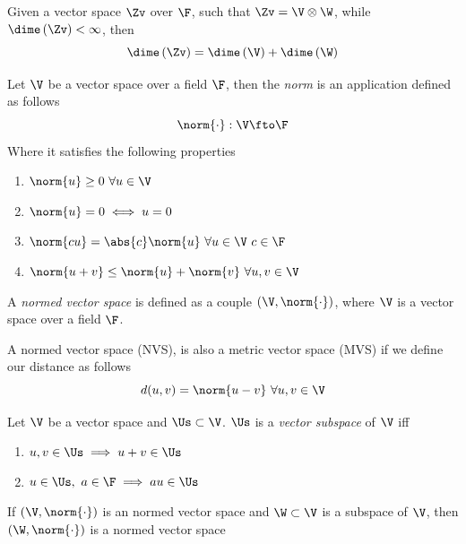 \documentclass[../mmf.tex]{subfiles}
\begin{document}
\begin{thm}
	Given a vector space $\Zv$ over $\F$, such that $\Zv=\V\otimes\W$, while $\dime\left( \Zv \right)<\infty$, then
	\begin{equation*}
		\dime\left( \Zv \right)=\dime\left( \V \right)+\dime\left( \W \right)
	\end{equation*}
\end{thm}
\begin{dfn}[Norm]
	Let $\V$ be a vector space over a field $\F$, then the \textit{norm} is an application defined as follows
	\begin{equation*}
		\norm{\cdot}:\V\fto\F
	\end{equation*}
	Where it satisfies the following properties
	\begin{enumerate}
	\item $\norm{u}\ge0\ \forall u\in\V$
	\item $\norm{u}=0\iff u=0$
	\item $\norm{cu}=\abs{c}\norm{u}\ \forall u\in\V\ c\in\F$
	\item $\norm{u+v}\le\norm{u}+\norm{v}\ \forall u,v\in\V$
	\end{enumerate}
\end{dfn}
\begin{dfn}
	A \textit{normed vector space} is defined as a couple $(\V,\norm{\cdot})$, where $\V$ is a vector space over a field $\F$.
\end{dfn}
\begin{prop}
	A normed vector space (NVS), is also a metric vector space (MVS) if we define our distance as follows
	\begin{equation*}
		d(u,v)=\norm{u-v}\ \forall u,v\in\V
	\end{equation*}
\end{prop}
\begin{dfn}
	Let $\V$ be a vector space and $\Us\subset\V$. $\Us$ is a \textit{vector subspace} of $\V$ iff
	\begin{enumerate}
	\item $u,v\in\Us\implies{} u+v\in\Us$
	\item $u\in\Us,\ a\in\F\implies{} au\in\Us$
	\end{enumerate}
\end{dfn}
\begin{prop}
	If $(\V,\norm{\cdot})$ is an normed vector space and $\W\subset\V$ is a subspace of $\V$, then $(\W,\norm{\cdot})$ is a normed vector space
\end{prop}
\end{document}
